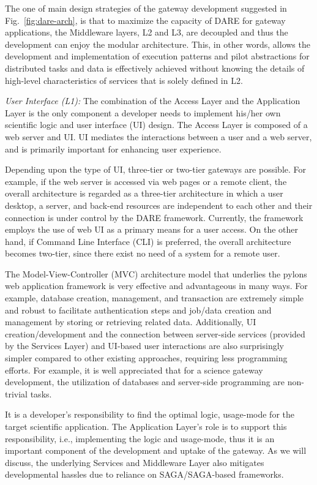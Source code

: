 \documentclass[]{article}
\begin{document}
The one of main design strategies of the gateway development suggested in Fig.~\ref{fig:dare-arch}, is that to maximize the capacity of DARE for gateway applications, the Middleware layers, L2 and L3, are decoupled and thus the development can enjoy the modular architecture.  This, in other words, allows the development and implementation of execution patterns and pilot abstractions for distributed tasks and data is effectively achieved without knowing the details of high-level characteristics of services that is solely defined in L2. 


\textit{User Interface (L1):} The combination of the Access Layer
and the Application Layer is the only component a developer needs to
implement his/her own scientific logic and user interface (UI) design.
The Access Layer is composed of a web server and UI.  UI mediates the
interactions between a user and a web server, and is primarily
important for enhancing user experience.

Depending upon the type of UI, three-tier or two-tier gateways are
possible.  For example, if the web server is accessed via web pages or
a remote client, the overall architecture is regarded as a three-tier
architecture in which a user desktop, a server, and back-end resources
are independent to each other and their connection is under control by
the DARE framework.  Currently, the framework employs the use of web
UI as a primary means for a user access.  On the other hand, if
Command Line Interface (CLI) is preferred, the overall architecture
becomes two-tier, since there exist no need of a system for a remote
user.  %

The Model-View-Controller (MVC) architecture model that underlies the
pylons web application framework\cite{pylonsurl} is very effective and advantageous in
many ways. For example, database creation, management, and transaction
are extremely simple and robust to facilitate authentication steps and
job/data creation and management by storing or retrieving related
data.  Additionally, UI creation/development and the connection
between server-side services (provided by the Services Layer) and
UI-based user interactions are also surprisingly simpler compared to
other existing approaches, requiring less programming efforts.  For
example, it is well appreciated that for a science gateway
development, the utilization of databases and server-side programming
are non-trivial tasks.

It is a developer's responsibility to find the optimal logic,
usage-mode for the target scientific application.  The Application
Layer's role is to support this responsibility, i.e., implementing the
logic and usage-mode, thus it is an important component of the
development and uptake of the gateway. As we will discuss, the
underlying Services and Middleware Layer also mitigates developmental
hassles due to reliance on SAGA/SAGA-based frameworks.
\end{document}
